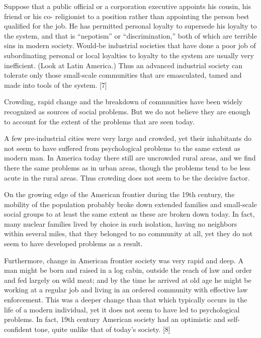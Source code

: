  Suppose that a public official or a corporation executive appoints his cousin, his friend or his co- religionist to a position rather than appointing the person best qualified for the job. He has permitted personal loyalty to supersede his loyalty to the system, and that is “nepotism” or “discrimination,” both of which are terrible sins in modern society. Would-be industrial societies that have done a poor job of subordinating personal or local loyalties to loyalty to the system are usually very inefficient. (Look at Latin America.) Thus an advanced industrial society can tolerate only those small-scale communities that are emasculated, tamed and made into tools of the system. [7]

 Crowding, rapid change and the breakdown of communities have been widely recognized as sources of social problems. But we do not believe they are enough to account for the extent of the problems that are seen today.

 A few pre-industrial cities were very large and crowded, yet their inhabitants do not seem to have suffered from psychological problems to the same extent as modern man. In America today there still are uncrowded rural areas, and we find there the same problems as in urban areas, though the problems tend to be less acute in the rural areas. Thus crowding does not seem to be the decisive factor.

 On the growing edge of the American frontier during the 19th century, the mobility of the population probably broke down extended families and small-scale social groups to at least the same extent as these are broken down today. In fact, many nuclear families lived by choice in such isolation, having no neighbors within several miles, that they belonged to no community at all, yet they do not seem to have developed problems as a result.

 Furthermore, change in American frontier society was very rapid and deep. A man might be born and raised in a log cabin, outside the reach of law and order and fed largely on wild meat; and by the time he arrived at old age he might be working at a regular job and living in an ordered community with effective law enforcement. This was a deeper change than that which typically occurs in the life of a modern individual, yet it does not seem to have led to psychological problems. In fact, 19th century American society had an optimistic and self-confident tone, quite unlike that of today’s society. [8]

